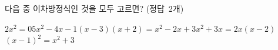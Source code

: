 다음 중 이차방정식인 것을 모두 고르면? \mbox{(정답 2개)}
\begin{choicesv}{$2x^2=0$}{$5x^2-4x-1$}{$(x-3)(x+2)=x^2-2x+3$}{$x^2+3x=2x(x-2)$}{$(x-1)^2=x^2+3$}\end{choicesv}
